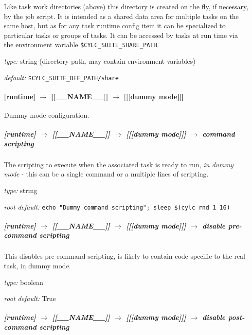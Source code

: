 Like task work directories (above) this directory is created on the fly,
if necessary, by the job script. It is intended as a shared data area
for multiple tasks on the same host, but as for any task runtime config
item it can be specialized to particular tasks or groups of tasks. 
It can be accessed by tasks at run time via the environment variable
\lstinline=$CYLC_SUITE_SHARE_PATH=.

\begin{myitemize}
\item {\em type:} string (directory path, may contain environment variables)
\item {\em default:} \lstinline=$CYLC_SUITE_DEF_PATH/share=
\end{myitemize}

\paragraph[{[[[}dummy mode{]]]}]{[runtime] $\rightarrow$ [[\_\_NAME\_\_]] $\rightarrow$ [[[dummy mode]]]}

Dummy mode configuration.

\subparagraph[command scripting]{[runtime] $\rightarrow$ [[\_\_NAME\_\_]] $\rightarrow$ [[[dummy mode]]] $\rightarrow$ command scripting}

The scripting to execute when the associated task is ready to run, {\em
in dummy mode} - this can be a single command or a multiple lines of
scripting. 

\begin{myitemize}
\item {\em type:} string
\item {\em root default:} \lstinline=echo "Dummy command scripting"; sleep $(cylc rnd 1 16)=
\end{myitemize}

\subparagraph[disable pre-command scripting]{[runtime] $\rightarrow$ [[\_\_NAME\_\_]] $\rightarrow$ [[[dummy mode]]] $\rightarrow$ disable pre-command scripting}

This disables pre-command scripting, is likely to contain code specific
to the real task, in dummy mode. 

\begin{myitemize}
\item {\em type:} boolean
\item {\em root default:} True
\end{myitemize}

\subparagraph[disable post-command scripting]{[runtime] $\rightarrow$ [[\_\_NAME\_\_]] $\rightarrow$ [[[dummy mode]]] $\rightarrow$ disable post-command scripting}

